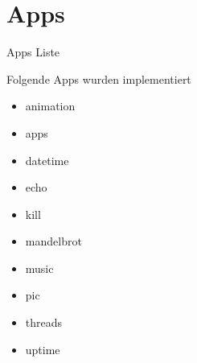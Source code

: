 \section{Apps}



\begin{frame}{Apps Liste}
    \begin{Large}
        Folgende Apps wurden implementiert
    \end{Large}
    \vspace{15pt}

    \begin{itemize}
        \item animation
        \item apps
        \item datetime
        \item echo
        \item kill
        \item mandelbrot
        \item music
        \item pic
        \item threads
        \item uptime
    \end{itemize}
    
\end{frame}


